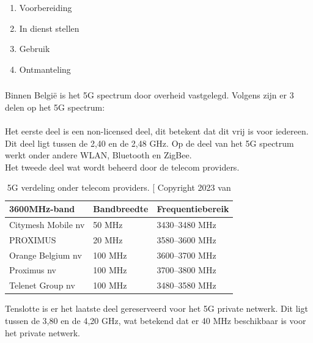 \begin{enumerate}
  \item Voorbereiding
  \item In dienst stellen
  \item Gebruik
  \item Ontmanteling
\end{enumerate}


\subsubsection{}
\label{public-v-private}

Binnen België is het 5G spectrum door overheid vastgelegd. Volgens \textcite{Eede2023} zijn er 3 delen op het 5G spectrum:\\\\
Het eerste deel is een non-licensed deel, dit betekent dat dit vrij is voor iedereen. Dit deel ligt tussen de 2,40 en de 2,48 GHz. Op de deel van het 5G spectrum werkt onder andere WLAN, Bluetooth en ZigBee.\\
Het tweede deel wat wordt beheerd door de telecom providers.

\begin{table}[H]
\centering
\begin{tabular}{|l|l|l|}
\hline
\textbf{3600MHz-band}      & \textbf{Bandbreedte} & \textbf{Frequentiebereik}    \\ \hline
Citymesh Mobile nv         & 50 MHz               & 3430--3480 MHz               \\ \hline
PROXIMUS                   & 20 MHz               & 3580--3600 MHz               \\ \hline
Orange Belgium nv          & 100 MHz              & 3600--3700 MHz               \\ \hline
Proximus nv                & 100 MHz              & 3700--3800 MHz               \\ \hline
Telenet Group nv           & 100 MHz              & 3480--3580 MHz               \\ \hline
\end{tabular}
\caption{5G verdeling onder telecom providers. \autocite[Door]{Eede2023} [ Copyright 2023 van \textcite{Eede2023}}
\end{table}


Tenslotte is er het laatste deel gereserveerd voor het 5G private netwerk.  Dit ligt tussen de 3,80 en de 4,20 GHz, wat betekend dat er 40 MHz beschikbaar is voor het private netwerk.


